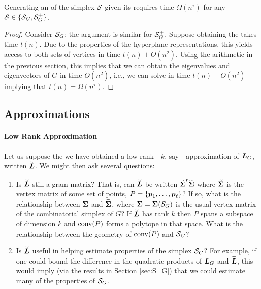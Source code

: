 \begin{lemma}
	\label{lem:hdesc_to_vdesc}
	Generating an \vdesc of the simplex $\mathcal{S}$ given its \hdesc requires time $\Omega(n^\tau)$ for any $\mathcal{S}\in\{\mathcal{S}_G,\mathcal{S}_G^+\}$. 
\end{lemma}
\begin{proof}
	Consider $\mathcal{S}_G$; the argument is similar for $\mathcal{S}_G^+$. Suppose obtaining the \hdesc takes time $t(n)$. Due to the properties of the hyperplane representations, this yields access to both sets of vertices in time $t(n)+O(n^2)$. Using the arithmetic in the previous section, this implies that we can obtain the eigenvalues and eigenvectors of $G$ in time $O(n^2)$, i.e., we can solve \lapdecomp in time $t(n)+O(n^2)$ implying that $t(n)=\Omega(n^\tau)$. 
\end{proof}






\subsection{Approximations} 

\paragraph{Low Rank Approximation}

Let us suppose the we have obtained a low rank---$k$, say---approximation of $\vb*{L}_G$, written $\widetilde{\vb*{L}}$. We might then ask several questions: 
\begin{enumerate}
	\item Is $\widetilde{\vb*{L}}$ still a gram matrix? That is, can $\widetilde{\vb*{L}}$ be written $\widetilde{\boldsymbol{\Sigma}}^t\widetilde{\boldsymbol{\Sigma}}$ where $\widetilde{\boldsymbol{\Sigma}}$ is the vertex matrix of some set of points, $P=\{\vb*{p}_1,\dots,\vb*{p}_\ell\}$? If so, what is the relationship between $\boldsymbol{\Sigma}$ and $\widetilde{\boldsymbol{\Sigma}}$, where $\boldsymbol{\Sigma}=\boldsymbol{\Sigma}(\mathcal{S}_G)$ is the usual vertex matrix of the combinatorial simplex of $G$? If $\widetilde{\vb*{L}}$ has rank $k$ then $P$ spans a subspace of dimension $k$ and $\textnormal{conv}(P)$ forms a polytope in that space. What is the relationship between the geometry of $\textnormal{conv}(P)$ and $\mathcal{S}_G$?
	\item Is $\widetilde{\vb*{L}}$ useful in helping estimate properties of the simplex $\mathcal{S}_G$? For example, if one could bound the difference in the quadratic products of $\vb*{L}_G$ and $\widetilde{\vb*{L}}$, this would imply (via the results in Section \ref{sec:S_G}) that we could estimate many of the properties of $\mathcal{S}_G$. 
	\end{enumerate}

